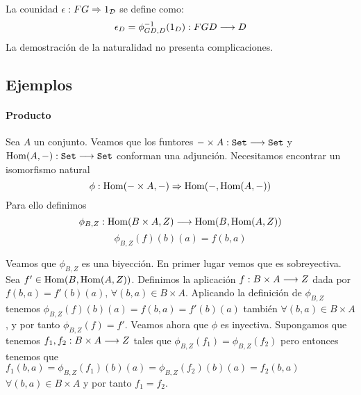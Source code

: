 La counidad $\epsilon: FG\Rightarrow 1_{\mathcal{D}}$ se define como:
$$\epsilon_D = \phi_{GD, D}^{-1}(1_D) : FGD\longrightarrow D$$
La demostración de la naturalidad no presenta complicaciones.

\subsection{Ejemplos}
\paragraph{Producto}
Sea $A$ un conjunto. Veamos que los funtores
$-\times A : \texttt{Set}\longrightarrow \texttt{Set}$ y
$\operatorname{Hom}(A, -) : \texttt{Set}\longrightarrow \texttt{Set}$ conforman una adjunción.
Necesitamos encontrar un isomorfismo natural
$$\phi : \operatorname{Hom}(-\times A, -)\Rightarrow \operatorname{Hom}(-, \operatorname{Hom}(A, -))$$
Para ello definimos
$$\phi_{B, Z} : \operatorname{Hom}(B\times A, Z)\longrightarrow \operatorname{Hom}(B, \operatorname{Hom}(A, Z))$$
$$\phi_{B, Z}(f)(b)(a) = f(b, a)$$

Veamos que $\phi_{B, Z}$ es una biyección.
En primer lugar vemos que es sobreyectiva.
Sea $f' \in \operatorname{Hom}(B, \operatorname{Hom}(A, Z))$. Definimos la aplicación
$f : B\times A\longrightarrow Z$ dada por $f(b, a) = f'(b)(a), \,  \forall (b, a) \in B\times A$. Aplicando
la definición de $\phi_{B, Z}$
tenemos $\phi_{B,Z}(f)(b)(a) = f(b, a) = f'(b)(a)$ también $\forall (b, a) \in B\times A$, y por tanto
$\phi_{B,Z}(f) = f'$. Veamos ahora que $\phi$ es inyectiva. Supongamos
que tenemos $f_1, f_2 : B\times A\longrightarrow Z$ tales que
$\phi_{B, Z}(f_1) = \phi_{B, Z}(f_2)$ pero entonces tenemos que
$f_1(b, a) = \phi_{B, Z}(f_1)(b)(a) = \phi_{B,Z}(f_2)(b)(a) = f_2(b, a)$
$\forall (b, a) \in B\times A$
y por tanto $f_1 = f_2$.

